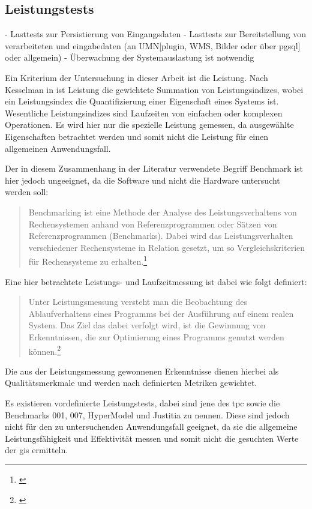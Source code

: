 \subsection{Leistungstests}
\label{Leistungstests}

- Lasttests zur Persistierung von Eingangsdaten
- Lasttests zur Bereitstellung von verarbeiteten und eingabedaten (an UMN[plugin, WMS, Bilder oder über pgsql] oder allgemein)
- Überwachung der Systemauslastung ist notwendig

Ein Kriterium der Untersuchung in dieser Arbeit ist die Leistung.
Nach Kesselman in \cite[S.20]{book:Leistungsanalyse} ist Leistung die gewichtete Summation von Leistungsindizes, wobei ein Leistungsindex die Quantifizierung einer Eigenschaft eines Systems ist.
Wesentliche Leistungsindizes sind Laufzeiten von einfachen oder komplexen Operationen.
Es wird hier nur die spezielle Leistung gemessen, da ausgewählte Eigenschaften betrachtet werden und somit nicht die Leistung für einen allgemeinen Anwendungsfall.

Der in diesem Zusammenhang in der Literatur verwendete Begriff Benchmark ist hier jedoch ungeeignet, da die Software und nicht die Hardware untersucht werden soll:
\begin {quote}
Benchmarking ist eine Methode der Analyse des Leistungsverhaltens von Rechensystemen anhand von Referenzprogrammen oder Sätzen von Referenzprogrammen (Benchmarks). Dabei wird das Leistungsverhalten verschiedener Rechensysteme in Relation gesetzt, um so Vergleichskriterien  für Rechensysteme zu erhalten.\footnote{\cite[S.24]{book:Leistungsanalyse}}
\end{quote}
Eine hier betrachtete Leistungs- und Laufzeitmessung ist dabei wie folgt definiert:
\begin {quote}
Unter Leistungsmessung versteht man die Beobachtung des Ablaufverhaltens eines Programms bei der Ausführung auf einem realen System. Das Ziel das dabei verfolgt wird, ist die Gewinnung von Erkenntnissen, die zur Optimierung eines Programms genutzt werden können.\footnote{\cite[S.28]{book:Leistungsanalyse}}
\end{quote}
Die aus der Leistungsmessung gewonnenen Erkenntnisse dienen hierbei als Qualitätsmerkmale und werden nach definierten Metriken gewichtet.

Es existieren vordefinierte Leistungstests, dabei sind jene des \Gls{tpc} sowie die Benchmarks 001, 007, HyperModel und Justitia zu nennen.
Diese sind jedoch nicht für den zu untersuchenden Anwendungsfall geeignet, da sie die allgemeine Leistungsfähigkeit und Effektivität messen und somit nicht die gesuchten Werte der \Gls{gis} ermitteln.